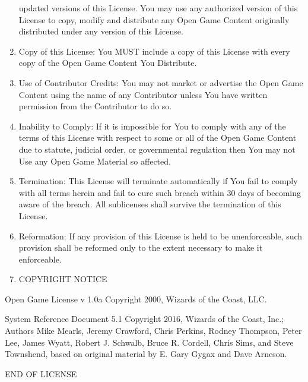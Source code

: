 \documentclass[
]{article}
\begin{document}
\begin{enumerate}
  updated versions of this License. You may use any authorized version
  of this License to copy, modify and distribute any Open Game Content
  originally distributed under any version of this License.
\item
  Copy of this License: You MUST include a copy of this License with
  every copy of the Open Game Content You Distribute.
\item
  Use of Contributor Credits: You may not market or advertise the Open
  Game Content using the name of any Contributor unless You have written
  permission from the Contributor to do so.
\item
  Inability to Comply: If it is impossible for You to comply with any of
  the terms of this License with respect to some or all of the Open Game
  Content due to statute, judicial order, or governmental regulation
  then You may not Use any Open Game Material so affected.
\item
  Termination: This License will terminate automatically if You fail to
  comply with all terms herein and fail to cure such breach within 30
  days of becoming aware of the breach. All sublicenses shall survive
  the termination of this License.
\item
  Reformation: If any provision of this License is held to be
  unenforceable, such provision shall be reformed only to the extent
  necessary to make it enforceable.
\item
  COPYRIGHT NOTICE
\end{enumerate}

Open Game License v 1.0a Copyright 2000, Wizards of the Coast, LLC.

System Reference Document 5.1 Copyright 2016, Wizards of the Coast,
Inc.; Authors Mike Mearls, Jeremy Crawford, Chris Perkins, Rodney
Thompson, Peter Lee, James Wyatt, Robert J. Schwalb, Bruce R. Cordell,
Chris Sims, and Steve Townshend, based on original material by E. Gary
Gygax and Dave Arneson.

END OF LICENSE
\end{document}
